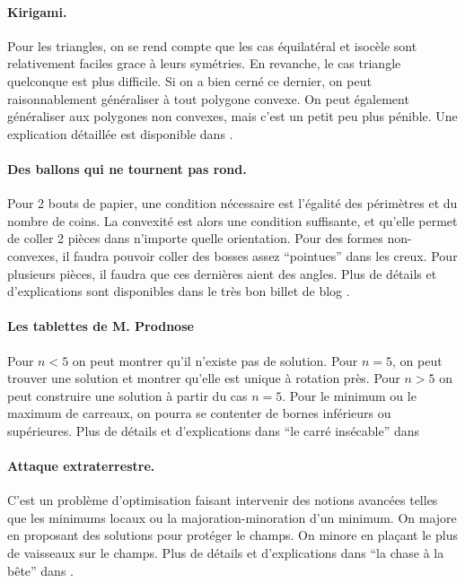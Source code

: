 \documentclass[a4paper,10pt,oneside]{article}
\begin{document}
\paragraph*{Kirigami.}
Pour les triangles, on se rend compte que les cas équilatéral et isocèle sont relativement faciles grace à leurs symétries.
En revanche, le cas triangle quelconque est plus difficile.
Si on a bien cerné ce dernier, on peut raisonnablement généraliser à tout polygone convexe.
On peut également généraliser aux polygones non convexes, mais c'est un petit peu plus pénible.
Une explication détaillée est disponible dans \cite{fiorellivilmartCoupCiseaux2010}.

\paragraph*{Des ballons qui ne tournent pas rond.}
Pour 2 bouts de papier, une condition nécessaire est l'égalité des périmètres et du nombre de coins.
La convexité est alors une condition suffisante, et qu'elle permet de coller 2 pièces dans n'importe quelle orientation.
Pour des formes non-convexes, il faudra pouvoir coller des bosses assez ``pointues'' dans les creux.
Pour plusieurs pièces, il faudra que ces dernières aient des angles.
Plus de détails et d'explications sont disponibles dans le très bon billet de blog \cite{ghysBrazucaBallonCubique2014}.

\paragraph*{Les tablettes de M. Prodnose}
Pour $n<5$ on peut montrer qu'il n'existe pas de solution.
Pour $n=5$, on peut trouver une solution et montrer qu'elle est unique à rotation près.
Pour $n>5$ on peut construire une solution à partir du cas $n=5$.
Pour le minimum ou le maximum de carreaux, on pourra se contenter de bornes inférieurs ou supérieures.
Plus de détails et d'explications dans ``le carré insécable'' dans \cite{grenierSituationsRecherchePour2017}

\paragraph*{Attaque extraterrestre.}
C'est un problème d'optimisation faisant intervenir des notions avancées telles que les minimums locaux ou la majoration-minoration d'un minimum.
On majore en proposant des solutions pour protéger le champs.
On minore en plaçant le plus de vaisseaux sur le champs.
Plus de détails et d'explications dans ``la chase à la bête'' dans \cite{grenierSituationsRecherchePour2017}.
\end{document}
